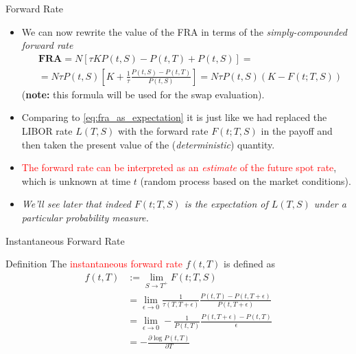 \documentclass{beamer}
\begin{document}
\begin{frame}{Forward Rate}
	\begin{itemize}
		\item We can now rewrite the value of the FRA in terms of the \emph{simply-compounded forward rate}
		\begin{equation}
			\begin{aligned}
			&\textbf{FRA}=N[\tau KP(t,S)-P(t,T)+P(t,S)] = \\
			&=N\tau P(t,S) \left[K +\frac{1}{\tau} \frac{P(t,S)-P(t,T)}{P(t,S)}\right] = N\tau P(t,S)(K-F(t;T,S))
			\end{aligned}
			\label{eq:fram_payoff_withF}
		\end{equation}
		(\textbf{note:} this formula will be used for the swap evaluation).
		\item<2-> Comparing to \cref{eq:fra_as_expectation} it is just like we had replaced the LIBOR rate $L(T,S)$ with the forward rate $F(t;T,S)$ in the payoff and then taken the present value of the (\emph{deterministic}) quantity.
		\item<3-> \textcolor{red}{The forward rate can be interpreted as an \emph{estimate} of the future spot rate}, which is unknown at time $t$ (random process based on the market conditions).
		\item<4-> \emph{We'll see later that indeed $F(t;T,S)$ is the expectation of $L(T,S)$ under a particular probability measure.}
	\end{itemize}
\end{frame}

\begin{frame}{Instantaneous Forward Rate}
	\begin{block}{Definition}
	The \textcolor{red}{instantaneous forward rate} $f(t, T)$ is defined as 
	\begin{equation}
		\begin{aligned}
			f(t, T) &:= \lim_{S\rightarrow T^+} F(t;T,S) \\
			& = \lim_{\epsilon\rightarrow 0}  \frac{1}{\tau(T,T+\epsilon)}\frac{P(t,T)-P(t,T+\epsilon)}{P(t,T+\epsilon)} \\
			& = \lim_{\epsilon\rightarrow 0} - \frac{1}{P(t,T)} \frac{P(t,T+\epsilon)-P(t,T)}{\epsilon} \\
			& = -\frac{\partial \log P(t, T)}{\partial T}
		\end{aligned}
	\end{equation}
	\end{block}
\end{frame}
\end{document}
